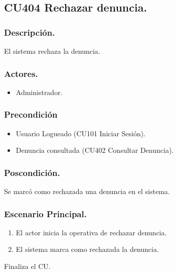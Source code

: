 \subsection{CU404 Rechazar denuncia.}
\subsubsection{Descripci\'{o}n.}
El sistema rechaza la denuncia.
\subsubsection{Actores.}
\begin{itemize}
\item Administrador.
\end{itemize}
\subsubsection{Precondici\'{o}n}
\begin{itemize}
\item Usuario Logueado (CU101 Iniciar Sesi\'{o}n).
\item Denuncia consultada (CU402 Consultar Denuncia).
\end{itemize}
\subsubsection{Poscondici\'{o}n.}
Se marc\'{o} como rechazada una denuncia en el sistema.
\subsubsection{Escenario Principal.}
\begin{enumerate}
\item El actor inicia la operativa de rechazar denuncia.
\item El sistema marca como rechazada la denuncia.
\end{enumerate}
Finaliza el CU.
